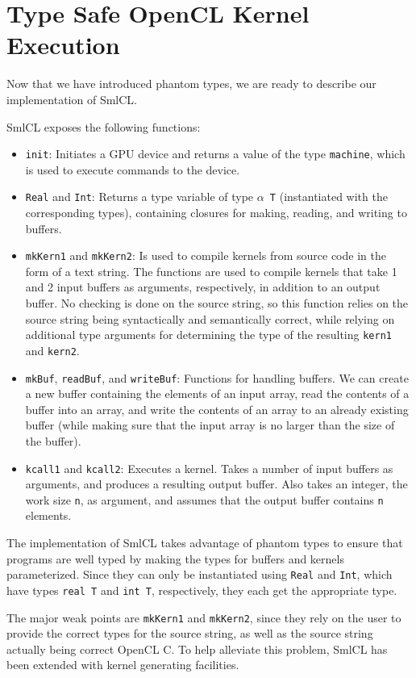 \section{Type Safe OpenCL Kernel Execution}

Now that we have introduced phantom types, we are ready to describe
our implementation of SmlCL.

SmlCL exposes the following functions:

\begin{itemize}
  \item \texttt{init}: Initiates a GPU device and returns a value of
    the type \texttt{machine}, which is used to execute commands to
    the device.
  \item \texttt{Real} and \texttt{Int}: Returns a type variable of
    type \texttt{$\alpha$ T} (instantiated with the corresponding
    types), containing closures for making, reading, and writing to
    buffers.
  \item \texttt{mkKern1} and \texttt{mkKern2}: Is used to compile
    kernels from source code in the form of a text string. The
    functions are used to compile kernels that take 1 and 2 input
    buffers as arguments, respectively, in addition to an output
    buffer. No checking is done on the source string, so this function
    relies on the source string being syntactically and semantically
    correct, while relying on additional type arguments for
    determining the type of the resulting \texttt{kern1} and
    \texttt{kern2}.
  \item \texttt{mkBuf}, \texttt{readBuf}, and \texttt{writeBuf}:
    Functions for handling buffers. We can create a new buffer
    containing the elements of an input array, read the contents of a
    buffer into an array, and write the contents of an array to an
    already existing buffer (while making sure that the input array is
    no larger than the size of the buffer).
  \item \texttt{kcall1} and \texttt{kcall2}: Executes a kernel. Takes
    a number of input buffers as arguments, and produces a resulting
    output buffer. Also takes an integer, the work size \texttt{n}, as
    argument, and assumes that the output buffer contains \texttt{n}
    elements.
\end{itemize}

The implementation of SmlCL takes advantage of phantom types to
ensure that programs are well typed by making the types for buffers
and kernels parameterized. Since they can only be instantiated using
\texttt{Real} and \texttt{Int}, which have types \texttt{real T} and
\texttt{int T}, respectively, they each get the appropriate type.

The major weak points are \texttt{mkKern1} and \texttt{mkKern2}, since
they rely on the user to provide the correct types for the source
string, as well as the source string actually being correct OpenCL C.
To help alleviate this problem, SmlCL has been extended with kernel
generating facilities.
